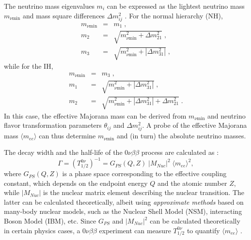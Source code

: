 The neutrino mass eigenvalues $m_i$ can be expressed as the lightest neutrino mass $m_{\nu \mathrm{min}}$ and mass square differences $\Delta m^2_{ij}$ \cite{suekane2015neutrino}. For the normal hierarchy (NH),
\begin{eqnarray*}
m_{\nu \mathrm{min}} &=& m_1 \; , \\
m_2 &=& \sqrt{m_{\nu \mathrm{min}}^2+\Delta m^2_{21}} \; , \\
m_3 &=& \sqrt{m_{\nu \mathrm{min}}^2+|\Delta m^2_{31}|} \; ,
\end{eqnarray*}
while for the IH, 
\begin{eqnarray*}
m_{\nu \mathrm{min}} &=& m_3 \; , \\
m_1 &=& \sqrt{m_{\nu \mathrm{min}}^2+|\Delta m^2_{31}|} \; , \\
m_2 &=& \sqrt{m_{\nu \mathrm{min}}^2+|\Delta m^2_{31}|+\Delta m^2_{21}} \; .
\end{eqnarray*}
In this case, the effective Majorana mass can be derived from $m_{\nu \mathrm{min}}$ and neutrino flavor transformation parameters $\theta_{ij}$ and $\Delta m^2_{ij}$. A probe of the effective Majorana mass $\langle m_{ee}\rangle$ can thus determine $m_{\nu \mathrm{min}}$ and (in turn) the absolute neutrino masses. 

The decay width and the half-life of the $0\nu\beta\beta$ process are calculated as \cite{suekane2015neutrino,zuber2020neutrino}:
\begin{equation}\label{eq:decayWidth0vbb}
\Gamma=(T^{0\nu}_{1/2})^{-1} = G_{PS}(Q,Z) \; |M_{Nuc}|^2 \; \langle m_{ee}\rangle^2, 
\end{equation}
where $G_{PS}(Q,Z)$ is a phase space corresponding to the effective coupling constant, which depends on the endpoint energy $Q$ and the atomic number $Z$, while $|M_{Nuc}|$ is the nuclear matrix element describing the nuclear transition. The latter can be calculated theoretically, albeit using {\em approximate methods} based on many-body nuclear models, such as the Nuclear Shell Model (NSM), interacting Boson Model (IBM), etc. Since $G_{PS}$ and $|M_{Nuc}|^2$ can be calculated theoretically in certain physics cases, a $0\nu\beta\beta$ experiment can measure $T^{0\nu}_{1/2}$ to quantify $\langle m_{ee}\rangle$ \cite{zuber2020neutrino,dolinski2019neutrinoless}.

